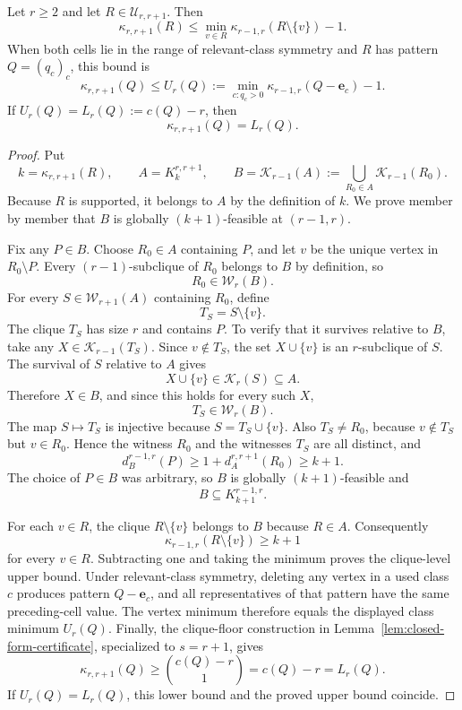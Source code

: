 \begin{theorem}
\label{thm:formal-diagonal-upper-bound}
Let $r\geq2$ and let $R\in\mathcal U_{r,r+1}$.
%
Then
\[
\kappa_{r,r+1}(R)
\leq
\min_{v\in R}\kappa_{r-1,r}(R\setminus\{v\})-1.
\]
When both cells lie in the range of relevant-class symmetry and $R$ has pattern $Q=(q_c)_c$, this bound is
\[
\kappa_{r,r+1}(Q)
\leq
U_r(Q):=
\min_{c:q_c>0}\kappa_{r-1,r}(Q-\mathbf e_c)-1.
\]
If $U_r(Q)=L_r(Q):=c(Q)-r$, then
\[
\kappa_{r,r+1}(Q)=L_r(Q).
\]
\end{theorem}
\begin{proof}
Put
\[
k=\kappa_{r,r+1}(R),
\qquad
A=K_k^{r,r+1},
\qquad
B=\mathcal K_{r-1}(A):=
\bigcup_{R_0\in A}\mathcal K_{r-1}(R_0).
\]
Because $R$ is supported, it belongs to $A$ by the definition of $k$.
%
We prove member by member that $B$ is globally $(k+1)$-feasible at $(r-1,r)$.

Fix any $P\in B$.
%
Choose $R_0\in A$ containing $P$, and let $v$ be the unique vertex in $R_0\setminus P$.
%
Every $(r-1)$-subclique of $R_0$ belongs to $B$ by definition, so
\[
R_0\in\mathcal W_r(B).
\]
For every $S\in\mathcal W_{r+1}(A)$ containing $R_0$, define
\[
T_S=S\setminus\{v\}.
\]
The clique $T_S$ has size $r$ and contains $P$.
%
To verify that it survives relative to $B$, take any $X\in\mathcal K_{r-1}(T_S)$.
%
Since $v\notin T_S$, the set $X\cup\{v\}$ is an $r$-subclique of $S$.
%
The survival of $S$ relative to $A$ gives
\[
X\cup\{v\}\in\mathcal K_r(S)\subseteq A.
\]
Therefore $X\in B$, and since this holds for every such $X$,
\[
T_S\in\mathcal W_r(B).
\]
The map $S\mapsto T_S$ is injective because $S=T_S\cup\{v\}$.
%
Also $T_S\neq R_0$, because $v\notin T_S$ but $v\in R_0$.
%
Hence the witness $R_0$ and the witnesses $T_S$ are all distinct, and
\[
d_B^{r-1,r}(P)
\geq 1+d_A^{r,r+1}(R_0)
\geq k+1.
\]
The choice of $P\in B$ was arbitrary, so $B$ is globally $(k+1)$-feasible and
\[
B\subseteq K_{k+1}^{r-1,r}.
\]

For each $v\in R$, the clique $R\setminus\{v\}$ belongs to $B$ because $R\in A$.
%
Consequently
\[
\kappa_{r-1,r}(R\setminus\{v\})\geq k+1
\]
for every $v\in R$.
%
Subtracting one and taking the minimum proves the clique-level upper bound.
%
Under relevant-class symmetry, deleting any vertex in a used class $c$ produces pattern $Q-\mathbf e_c$, and all representatives of that pattern have the same preceding-cell value.
%
The vertex minimum therefore equals the displayed class minimum $U_r(Q)$.
%
Finally, the clique-floor construction in Lemma~\ref{lem:closed-form-certificate}, specialized to $s=r+1$, gives
\[
\kappa_{r,r+1}(Q)\geq\binom{c(Q)-r}{1}=c(Q)-r=L_r(Q).
\]
If $U_r(Q)=L_r(Q)$, this lower bound and the proved upper bound coincide.
\end{proof}

